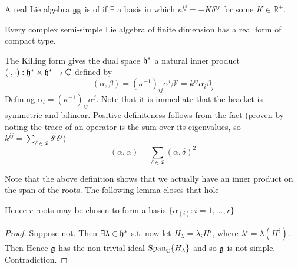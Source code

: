 \documentclass{article}
\begin{document}
\begin{definition}
	A real Lie algebra $\mathfrak{g}_\mathbb{R}$ is of  if $\exists$ a basis in which $\kappa^{ij}=-K\delta^{ij}$ for some $K\in\mathbb{R}^{+}$.
\end{definition}

\begin{fact}
	Every complex semi-simple Lie algebra of finite dimension has a real form of compact type.
\end{fact}


\begin{definition}
	The Killing form gives the dual space $\mathfrak{h}^\ast$ a natural inner product $(\cdot,\cdot):\mathfrak{h}^\ast \times \mathfrak{h}^\ast \to \mathbb{C}$ defined by 
	\[
	(\alpha, \beta) = \left(\kappa^{-1}\right)_{ij} \alpha^i \beta^j = k^{ij} \alpha_i \beta_j
	\]
	Defining $\alpha_i=\left( \kappa^{-1} \right)_{ij} \alpha^j$. Note that it is immediate that the bracket is symmetric and bilinear. Positive definiteness follows from the fact
	\eq{
		(\alpha,\beta) = \sum_{\delta \in \Phi} (\alpha,\delta) (\beta,\delta)
	}
	(proven by noting the trace of an operator is the sum over its eigenvalues, so $k^{ij} = \sum_{\delta \in \Phi} \delta^i \delta^j$)
	\[
	(\alpha, \alpha)=\sum_{\delta\in\Phi} (\alpha, \delta)^2
	\]
\end{definition}

Note that the above definition shows that we actually have an inner product on the span of the roots. The following lemma closes that hole 
\begin{lemma}
	Hence $r$ roots may be chosen to form a basis $\{ \alpha_{(i)} : i=1,\dots,r \}$
\end{lemma}
\begin{proof}
	Suppose not. Then $\exists \lambda \in \mathfrak{h}^\ast$ s.t. 
	now let $H_\lambda = \lambda_i H^i $, where $\lambda^i = \lambda (H^i)$. Then 
	Hence $\mathfrak{g}$ has the non-trivial ideal $\operatorname{Span}_{\mathbb{C}} \{H_{\lambda}\}$ and so $\mathfrak{g}$ is not simple. Contradiction. 
\end{proof}
\end{document}
